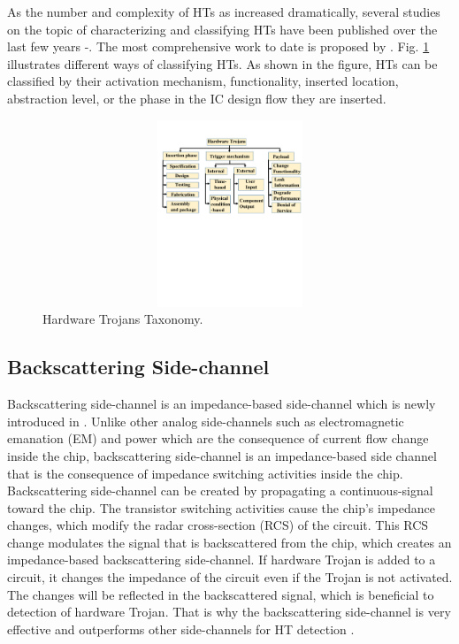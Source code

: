 \documentclass[journal]{IEEEtran}
\begin{document}
As the number and complexity of HTs as increased dramatically, several studies on the topic of characterizing and classifying HTs have been published over the last few years \cite{shakya2017benchmarking}\nocite{tehranipoor2010survey,karri2010trustworthy}-\cite{wang2008detecting}. The most comprehensive work to date is proposed by \cite{shakya2017benchmarking}. Fig. \ref{fig:taxonomy} illustrates different ways of classifying HTs. As shown in the figure, HTs can be classified by their activation mechanism, functionality, inserted location, abstraction level, or the phase in the IC design flow they are inserted.
\begin{figure}[tb]	
	\centering
	\includegraphics[viewport=0.1in 5.5in 21.3in 10in, clip,height=2.2in,width=9in,scale=1]{fig/HT_taxonomy.pdf}
	\caption{Hardware Trojans Taxonomy.}
	\label{fig:taxonomy}	
\end{figure}

\subsection{Backscattering Side-channel}
Backscattering side-channel is an impedance-based side-channel which is newly introduced in \cite{8701559}. Unlike other analog side-channels such as electromagnetic emanation (EM) and power which are the consequence of current flow change inside the chip, backscattering side-channel is an impedance-based side channel that is the consequence of impedance switching activities inside the chip. Backscattering side-channel can be created by propagating a continuous-signal toward the chip. The transistor switching activities cause the chip's impedance changes, which modify the radar cross-section (RCS) of the circuit. This RCS change modulates the signal that is backscattered from the chip, which creates an impedance-based backscattering side-channel. If hardware Trojan is added to a circuit, it changes the impedance of the circuit even if the Trojan is not activated. The changes will be reflected in the backscattered signal, which is beneficial to detection of hardware Trojan. That is why the backscattering side-channel is very effective and outperforms other side-channels for HT detection \cite{8701559}.
\end{document}
